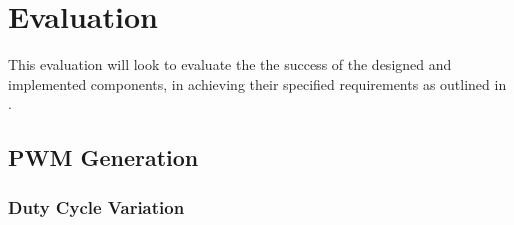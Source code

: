 \chapter{Evaluation}\label{C:evaluation}

This evaluation will look to evaluate the the success of the designed and implemented components, in achieving their specified requirements as outlined in .

	

	

	
	




\section{PWM Generation}\label{S:pwm_gen_eval}

\subsection*{Duty Cycle Variation}

